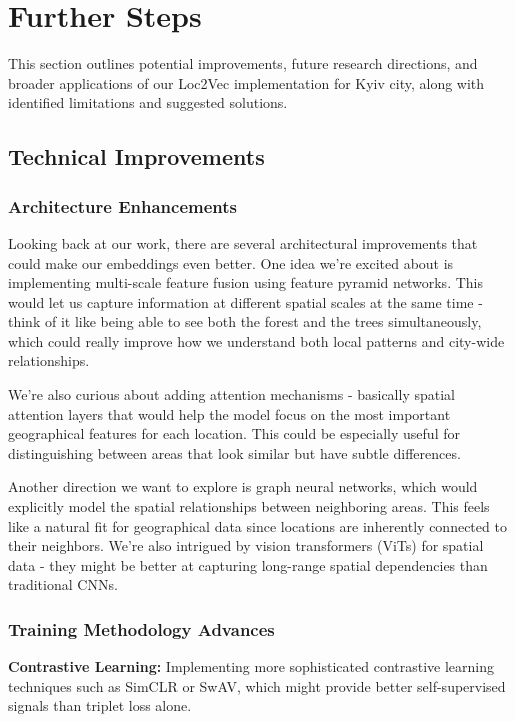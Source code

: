 \section{Further Steps}
\label{sec:further_steps}

This section outlines potential improvements, future research directions, and broader applications of our Loc2Vec implementation for Kyiv city, along with identified limitations and suggested solutions.

\subsection{Technical Improvements}

\subsubsection{Architecture Enhancements}

Looking back at our work, there are several architectural improvements that could make our embeddings even better. One idea we're excited about is implementing multi-scale feature fusion using feature pyramid networks. This would let us capture information at different spatial scales at the same time - think of it like being able to see both the forest and the trees simultaneously, which could really improve how we understand both local patterns and city-wide relationships.

We're also curious about adding attention mechanisms - basically spatial attention layers that would help the model focus on the most important geographical features for each location. This could be especially useful for distinguishing between areas that look similar but have subtle differences.

Another direction we want to explore is graph neural networks, which would explicitly model the spatial relationships between neighboring areas. This feels like a natural fit for geographical data since locations are inherently connected to their neighbors. We're also intrigued by vision transformers (ViTs) for spatial data - they might be better at capturing long-range spatial dependencies than traditional CNNs.

\subsubsection{Training Methodology Advances}

\textbf{Contrastive Learning:} Implementing more sophisticated contrastive learning techniques such as SimCLR or SwAV, which might provide better self-supervised signals than triplet loss alone.

